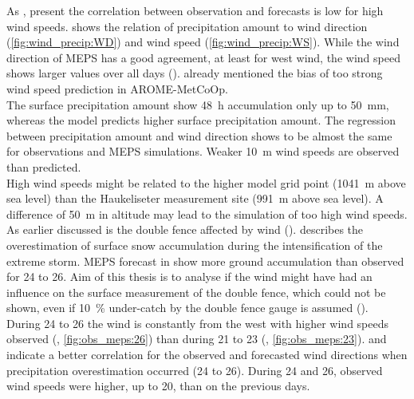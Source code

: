 \noindent
As ,  present the correlation between observation and forecasts is low for high wind speeds.  shows the relation of precipitation amount to wind direction (\ref{fig:wind_precip:WD}) and wind speed (\ref{fig:wind_precip:WS}).
While the wind direction of MEPS has a good agreement, at least for west wind, the wind speed shows larger values over all days ().
\citet{muller_arome-metcoop:_2017} already mentioned the bias of too strong wind speed prediction in AROME-MetCoOp.%
\\
The surface precipitation amount show \SI{48}{\hour} accumulation only up to \SI{50}{\mm}, whereas the model predicts higher surface precipitation amount. The regression between precipitation amount and wind direction shows to be almost the same for observations and MEPS simulations. Weaker \SI{10}{\metre} wind speeds are observed than predicted. 
\\
High wind speeds might be related to the higher model grid point (\SI{1041}{\metre} above sea level) than the Haukeliseter measurement site (\SI{991}{\metre} above sea level). A difference of \SI{50}{\metre} in altitude may lead to the simulation of too high wind speeds. As earlier discussed is the double fence affected by wind (). 
 describes the overestimation of surface snow accumulation during the intensification of the extreme storm. MEPS forecast in  show more ground accumulation than observed for \num{24} to \SI{26}{\dec}. Aim of this thesis is to analyse if the wind might have had an influence on the surface measurement of the double fence, which could not be shown, even if \SI{10}{\percent} under-catch by the double fence gauge is assumed ().
\\
During \num{24} to \SI{26}{\dec} the wind is constantly from the west with higher wind speeds observed (, \ref{fig:obs_meps:26}) than during \num{21} to \SI{23}{\dec} (, \ref{fig:obs_meps:23}).  and  indicate a better correlation for the observed and forecasted wind directions when precipitation overestimation occurred (\num{24} to \SI{26}{\dec}). During \num{24} and \SI{26}{\dec}, observed wind speeds were higher, up to \SI{20}{\mPs}, than on the previous days.
